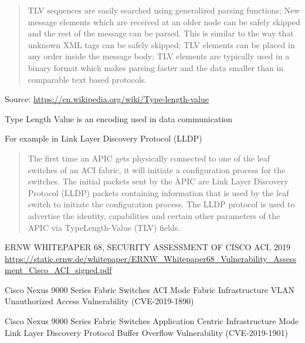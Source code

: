 \documentclass[Screen16to9,17pt]{foils}
\begin{document}
\begin{quote}
  TLV sequences are easily searched using generalized parsing functions;
New message elements which are received at an older node can be safely skipped and the rest of the message can be parsed. This is similar to the way that unknown XML tags can be safely skipped;
TLV elements can be placed in any order inside the message body;
TLV elements are typically used in a binary format which makes parsing faster and the data smaller than in comparable text based protocols.
\end{quote}
Source: \url{https://en.wikipedia.org/wiki/Type-length-value}

\begin{list2}
\item Type Length Value is an encoding used in data communication
\item For example in Link Layer Discovery Protocol (LLDP)
\end{list2}




\begin{quote}
  The first time an APIC gets physically connected to one of the leaf switches of an ACI fabric, it will initiate a
  configuration process for the switches. The initial packets sent by the APIC are Link Layer Discovery Protocol
  (LLDP) packets containing information that is used by the leaf switch to initiate the configuration process. The
  LLDP protocol is used to advertise the identity, capabilities and certain other parameters of the APIC via TypeLength-Value (TLV) fields.
\end{quote}

ERNW WHITEPAPER 68, SECURITY ASSESSMENT OF CISCO ACI, 2019\\
{\footnotesize\url{https://static.ernw.de/whitepaper/ERNW_Whitepaper68_Vulnerability_Assessment_Cisco_ACI_signed.pdf}}


\begin{list2}
\item Cisco Nexus 9000 Series Fabric Switches ACI Mode Fabric Infrastructure VLAN Unauthorized Access
Vulnerability (CVE-2019-1890)
\item Cisco Nexus 9000 Series Fabric Switches Application Centric Infrastructure Mode Link Layer Discovery
Protocol Buffer Overflow Vulnerability (CVE-2019-1901)
\end{list2}

\end{document}
